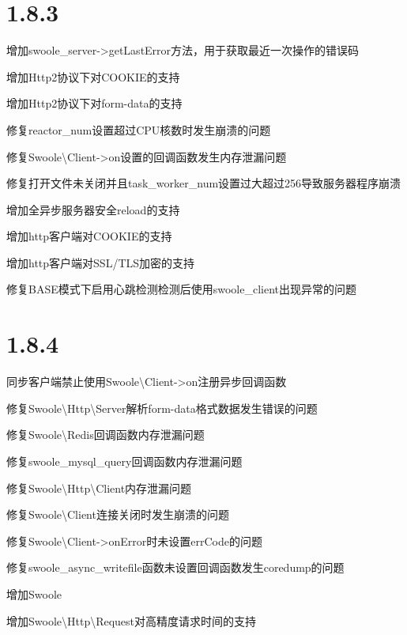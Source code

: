 \section{1.8.3}


\begin{compactitem}
\item 增加swoole\_server->getLastError方法，用于获取最近一次操作的错误码
\item 增加Http2协议下对COOKIE的支持
\item 增加Http2协议下对form-data的支持
\item 修复reactor\_num设置超过CPU核数时发生崩溃的问题
\item 修复Swoole\textbackslash Client->on设置的回调函数发生内存泄漏问题
\item 修复打开文件未关闭并且task\_worker\_num设置过大超过256导致服务器程序崩溃
\item 增加全异步服务器安全reload的支持
\item 增加http客户端对COOKIE的支持
\item 增加http客户端对SSL/TLS加密的支持
\item 修复BASE模式下启用心跳检测检测后使用swoole\_client出现异常的问题
\end{compactitem}

\section{1.8.4}

\begin{compactitem}
\item 同步客户端禁止使用Swoole\textbackslash Client->on注册异步回调函数
\item 修复Swoole\textbackslash Http\textbackslash Server解析form-data格式数据发生错误的问题
\item 修复Swoole\textbackslash Redis回调函数内存泄漏问题
\item 修复swoole\_mysql\_query回调函数内存泄漏问题
\item 修复Swoole\textbackslash Http\textbackslash Client内存泄漏问题
\item 修复Swoole\textbackslash Client连接关闭时发生崩溃的问题
\item 修复Swoole\textbackslash Client->onError时未设置errCode的问题
\item 修复swoole\_async\_writefile函数未设置回调函数发生coredump的问题
\item 增加Swoole
\item 增加Swoole\textbackslash Http\textbackslash Request对高精度请求时间的支持
\end{compactitem}



